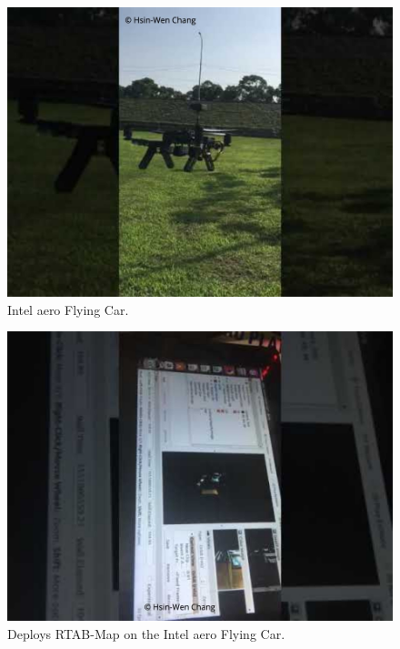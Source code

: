 \documentclass[10pt,journal,compsoc]{IEEEtran}
\begin{document}
\begin{figure}[thpb]
      \centering
      \includegraphics[width=\linewidth]{aero.jpeg}
      \caption{Intel aero Flying Car.}
      \label{fig:robot1}
\end{figure}
\begin{figure}[thpb]
      \centering
      \includegraphics[width=\linewidth]{RTAB-Map.jpeg}
      \caption{Deploys RTAB-Map on the Intel aero Flying Car.}
      \label{fig:robot1}
\end{figure}



\end{document}
